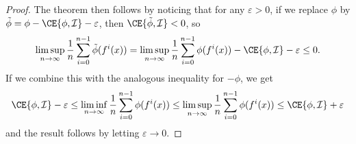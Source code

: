 \documentclass[../main.tex]{subfiles}
\begin{document}
\begin{proof}
  The theorem then follows by noticing that for  any \(\varepsilon > 0\), if we replace \(\phi\) by \(\tilde{\phi} = \phi - {\CE{\phi,\mathcal{I}}} - \varepsilon\), then \(\CE{\tilde{\phi}, \mathcal{I}} < 0\), so
  \begin{equation*}
    \limsup_{n \to \infty} \frac{1}{n}\sum_{i = 0}^{n - 1} \tilde\phi(f^i(x))
    = \limsup_{n \to \infty} \frac{1}{n}\sum_{i = 0}^{n - 1} \phi(f^i(x)) - \CE{\phi,\mathcal{I}} - \varepsilon \le 0.
  \end{equation*}
  If we combine this with the analogous inequality for \(-\phi\), we get
  \begin{equation*}
    \CE{\phi,\mathcal{I}} - \varepsilon \le \liminf_{n \to \infty} \frac{1}{n}\sum_{i = 0}^{n - 1} \phi(f^i(x)) \le 
    \limsup_{n \to \infty} \frac{1}{n}\sum_{i = 0}^{n - 1} \phi(f^i(x)) \le  \CE{\phi,\mathcal{I}} + \varepsilon
  \end{equation*}
  and the result follows by letting \(\varepsilon \to 0\).
\end{proof}
\end{document}
